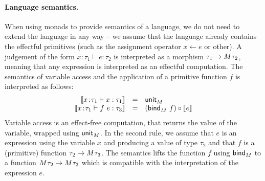 \paragraph{Language semantics.} When using monads to provide semantics of a language, we do not
need to extend the language in any way -- we assume that the language already contains the 
effectful primitives (such as the assignment operator $x \leftarrow e$ or other). A judgement
of the form $x\!:\!\tau_1 \vdash e : \tau_2$ is interpreted as a morphism $\tau_1 \rightarrow M^{}\tau_2$,
meaning that any expression is interpreted as an effectful computation. The semantics of variable
access and the application of a primitive function $f$ is interpreted as follows:
%
\begin{equation*}
\begin{array}{rcl}
 \llbracket x\!:\!\tau_1 \vdash x : \tau_1 \rrbracket &=& \textnormal{\sffamily unit}_M^{}\\
 \llbracket x\!:\!\tau_1 \vdash f~e : \tau_3 \rrbracket &=& (\textnormal{\sffamily bind}_M^{}~f) \circ \llbracket e \rrbracket\\
\end{array}
\end{equation*}
%
Variable access is an effect-free computation, that returns the value of the variable, wrapped
using $\textnormal{\sffamily unit}_M^{}$. In the second rule, we assume that $e$ is an expression using
the variable $x$ and producing a value of type $\tau_2$ and that $f$ is a (primitive) function
$\tau_2 \rightarrow M^{}\tau_3$. The semantics lifts the function $f$ using $\textnormal{\sffamily bind}_M^{}$
to a function $M^{}\tau_2 \rightarrow M^{}\tau_3$ which is compatible with the 
interpretation of the expression $e$.


